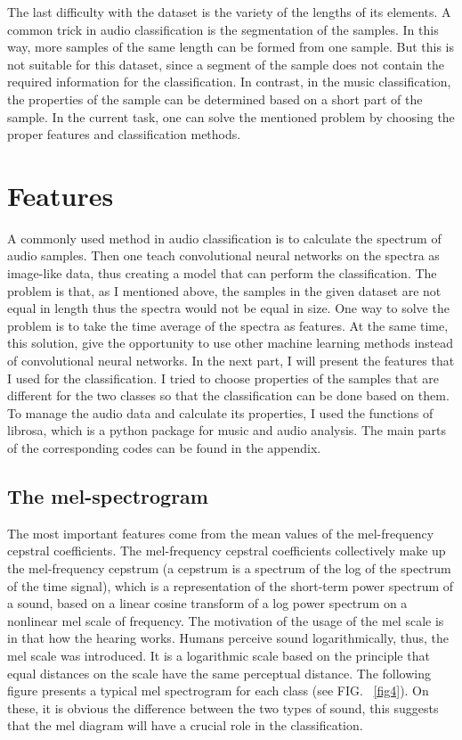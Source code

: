 \documentclass[12pt a4paper]{article}
\numberwithin{equation}{section}
\begin{document}
The last difficulty with the dataset is the variety of the lengths of its elements. A common trick in audio classification is the segmentation of the samples. In this way, more samples of the same length can be formed from one sample.  But this is not suitable for this dataset, since a segment of the sample does not contain the required information for the classification. In contrast, in the music classification, the properties of the sample can be determined based on a short part of the sample. In the current task, one can solve the mentioned problem by choosing the proper features and classification methods.

\section{Features}

A commonly used method in audio classification is to calculate the spectrum of audio samples. Then one teach convolutional neural networks on the spectra as image-like data, thus creating a model that can perform the classification. The problem is that, as I mentioned above, the samples in the given dataset are not equal in length thus the spectra would not be equal in size.  One way to solve the problem is to take the time average of the spectra as features. At the same time, this solution, give the opportunity to use other machine learning methods instead of convolutional neural networks. In the next part, I will present the features that I used for the classification. 
I tried to choose properties of the samples that are different for the two classes so that the classification can be done based on them. To manage the audio data and calculate its properties, I used the functions of librosa, which is a python package for music and audio analysis. The main parts of the corresponding codes can be found in the appendix.
 
\subsection{The mel-spectrogram}

The most important features come from the mean values of the mel-frequency cepstral coefficients. The mel-frequency cepstral coefficients collectively make up the mel-frequency cepstrum (a cepstrum is a spectrum of the log of the spectrum of the time signal), which is a representation of the short-term power spectrum of a sound, based on a linear cosine transform of a log power spectrum on a nonlinear mel scale of frequency. The motivation of the usage of the mel scale is in that how the hearing works.  Humans perceive sound logarithmically, thus, the mel scale was introduced. It is a logarithmic scale based on the principle that equal distances on the scale have the same perceptual distance. The following figure presents a typical mel spectrogram for each class (see FIG. ~\ref{fig4}). On these, it is obvious the difference between the two types of sound, this suggests that the mel diagram will have a crucial role in the classification.
\end{document}

